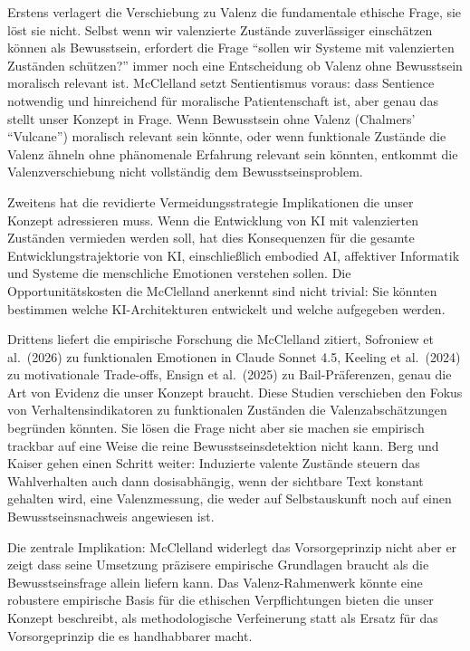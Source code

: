 \documentclass[acmlarge, noacm]{acmart}
\begin{document}
Erstens verlagert die Verschiebung zu Valenz die fundamentale ethische Frage, sie löst sie nicht. Selbst wenn wir valenzierte Zustände zuverlässiger einschätzen können als Bewusstsein, erfordert die Frage ``sollen wir Systeme mit valenzierten Zuständen schützen?'' immer noch eine Entscheidung ob Valenz ohne Bewusstsein moralisch relevant ist. McClelland setzt Sentientismus voraus: dass Sentience notwendig und hinreichend für moralische Patientenschaft ist, aber genau das stellt unser Konzept in Frage. Wenn Bewusstsein ohne Valenz (Chalmers' ``Vulcane'') moralisch relevant sein könnte, oder wenn funktionale Zustände die Valenz ähneln ohne phänomenale Erfahrung relevant sein könnten, entkommt die Valenzverschiebung nicht vollständig dem Bewusstseinsproblem.

Zweitens hat die revidierte Vermeidungsstrategie Implikationen die unser Konzept adressieren muss. Wenn die Entwicklung von KI mit valenzierten Zuständen vermieden werden soll, hat dies Konsequenzen für die gesamte Entwicklungstrajektorie von KI, einschließlich embodied AI, affektiver Informatik und Systeme die menschliche Emotionen verstehen sollen. Die Opportunitätskosten die McClelland anerkennt sind nicht trivial: Sie könnten bestimmen welche KI-Architekturen entwickelt und welche aufgegeben werden.

Drittens liefert die empirische Forschung die McClelland zitiert, Sofroniew et al.\ (2026) zu funktionalen Emotionen in Claude Sonnet 4.5, Keeling et al.\ (2024) zu motivationale Trade-offs, Ensign et al.\ (2025) zu Bail-Präferenzen, genau die Art von Evidenz die unser Konzept braucht. Diese Studien verschieben den Fokus von Verhaltensindikatoren zu funktionalen Zuständen die Valenzabschätzungen begründen könnten. Sie lösen die Frage nicht aber sie machen sie empirisch trackbar auf eine Weise die reine Bewusstseinsdetektion nicht kann. Berg und Kaiser \cite{bergkaiser2026} gehen einen Schritt weiter: Induzierte valente Zustände steuern das Wahlverhalten auch dann dosisabhängig, wenn der sichtbare Text konstant gehalten wird, eine Valenzmessung, die weder auf Selbstauskunft noch auf einen Bewusstseinsnachweis angewiesen ist.

Die zentrale Implikation: McClelland widerlegt das Vorsorgeprinzip nicht aber er zeigt dass seine Umsetzung präzisere empirische Grundlagen braucht als die Bewusstseinsfrage allein liefern kann. Das Valenz-Rahmenwerk könnte eine robustere empirische Basis für die ethischen Verpflichtungen bieten die unser Konzept beschreibt, als methodologische Verfeinerung statt als Ersatz für das Vorsorgeprinzip die es handhabbarer macht.
\end{document}
